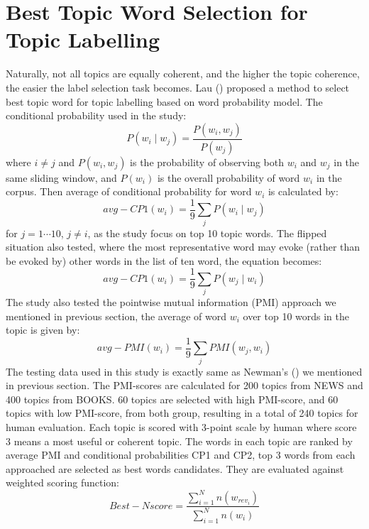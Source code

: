 \documentclass[11pt,twoside]{report}
\begin{document}
\section{Best Topic Word Selection for Topic Labelling}
Naturally, not all topics are equally coherent, and the higher the topic coherence, the easier the label selection task becomes. Lau (\cite{ref33}) proposed a method to select best topic word for topic labelling based on word probability model. The conditional probability used in the study:
\begin{equation}
P(w_{i}\mid w_{j}) = \frac{P(w_{i}, w_{j})}{P(w_{j})}
\end{equation}
where $i\neq j$ and $P(w_{i}, w_{j})$ is the probability of observing both $w_{i}$ and $w_{j}$ in the same sliding window, and $P(w_{i})$ is the overall probability of word $w_{i}$ in the corpus. Then average of conditional probability for word $w_{i}$ is calculated by:
\begin{equation}
avg-CP1(w_{i}) = \frac{1}{9} \sum_{j}P(w_{i} \mid w_{j})
\end{equation}
for $j = 1\cdots 10$, $j \neq i$, as the study focus on top 10 topic words. The flipped situation also tested, where the most representative word may evoke (rather than be evoked by) other words in the list of ten word, the equation becomes:
\begin{equation}
avg-CP1(w_{i}) = \frac{1}{9} \sum_{j}P(w_{j} \mid w_{i})
\end{equation}
The study also tested the pointwise mutual information (PMI) approach we mentioned in previous section, the average of word $w_{i}$ over top 10 words in the topic is given by:
\begin{equation}
avg-PMI(w_{i}) = \frac{1}{9} \sum_{j}PMI(w_{j}, w_{i})
\end{equation}
The testing data used in this study is exactly same as Newman's (\cite{ref27}) we mentioned in previous section. The PMI-scores are calculated for 200 topics from NEWS and 400 topics from BOOKS. 60 topics are selected with high PMI-score, and 60 topics with low PMI-score, from both group, resulting in a total of 240 topics for human evaluation. Each topic is scored with 3-point scale by human where score 3 means a most useful or coherent topic. The words in each topic are ranked by average PMI and conditional probabilities CP1 and CP2, top 3 words from each approached are selected as best words candidates. They are evaluated against weighted scoring function:
\begin{equation}
Best-N score = \frac{\sum_{i=1}^{N}n(w_{rev_{i}})}{\sum_{i=1}^{N}n(w_{i})}
\end{equation}
\end{document}
